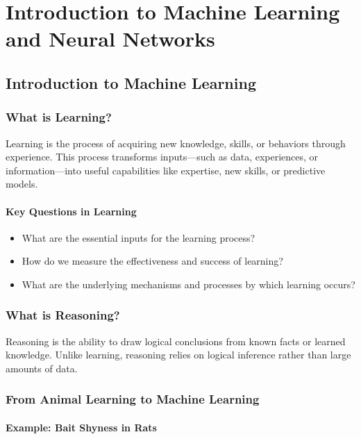 \chapter{Introduction to Machine Learning and Neural Networks}

\section{Introduction to Machine Learning}

\subsection{What is Learning?}

Learning is the process of acquiring new knowledge, skills, or behaviors through experience. This process transforms inputs—such as data, experiences, or information—into useful capabilities like expertise, new skills, or predictive models.

\subsubsection{Key Questions in Learning}

\begin{itemize}
\item What are the essential inputs for the learning process?
\item How do we measure the effectiveness and success of learning?
\item What are the underlying mechanisms and processes by which learning occurs?
\end{itemize}

\subsection{What is Reasoning?}

Reasoning is the ability to draw logical conclusions from known facts or learned knowledge. Unlike learning, reasoning relies on logical inference rather than large amounts of data.

\subsection{From Animal Learning to Machine Learning}

\subsubsection{Example: Bait Shyness in Rats}

